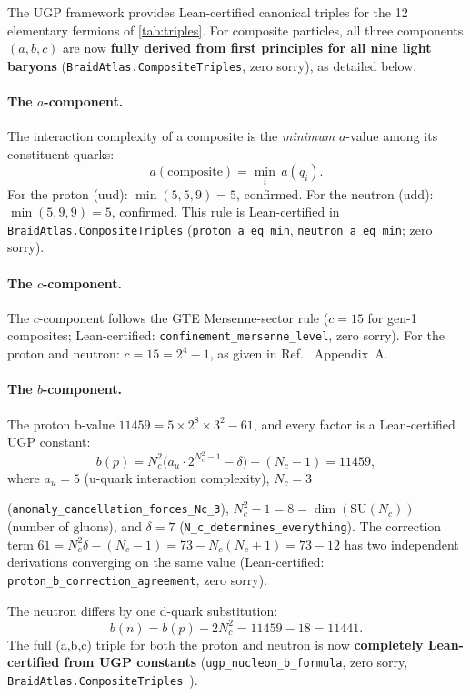 \documentclass[12pt,a4paper]{article}
\begin{document}
The UGP framework provides Lean-certified canonical triples for the 12
elementary fermions of \cref{tab:triples}.
For composite particles, all three components $(a,b,c)$ are now
\textbf{fully derived from first principles for all nine light baryons}
(\texttt{BraidAtlas.CompositeTriples}, zero sorry), as detailed below.

\paragraph{The $a$-component.}
The interaction complexity of a composite is the \emph{minimum} $a$-value
among its constituent quarks:
\[
  a(\text{composite}) = \min_i\, a(q_i).
\]
For the proton (uud): $\min(5,5,9) = 5$, confirmed.
For the neutron (udd): $\min(5,9,9) = 5$, confirmed.
This rule is Lean-certified in \texttt{BraidAtlas.CompositeTriples}
(\texttt{proton\_a\_eq\_min}, \texttt{neutron\_a\_eq\_min}; zero sorry).

\paragraph{The $c$-component.}
The $c$-component follows the GTE Mersenne-sector rule ($c = 15$
for gen-1 composites; Lean-certified: \texttt{confinement\_mersenne\_level}, zero sorry).
For the proton and neutron: $c = 15 = 2^4-1$, as given in
Ref.~\cite{Spivack2026_SM_UGP} Appendix~A.

\paragraph{The $b$-component.}
The proton b-value $11459 = 5\times 2^8\times 3^2 - 61$, and every factor
is a Lean-certified UGP constant:
\begin{equation}
  b(p) = N_c^2\bigl(a_u\cdot 2^{N_c^2-1} - \delta\bigr) + (N_c-1) = 11459,
  \label{eq:proton_b}
\end{equation}
where $a_u = 5$ (u-quark interaction complexity), $N_c = 3$
\begin{sloppypar}
(\texttt{anomaly\_cancellation\_forces\_Nc\_3}), $N_c^2-1 = 8 = \dim(\mathrm{SU}(N_c))$
(number of gluons), and $\delta = 7$
(\texttt{N\_c\_determines\_everything}).
The correction term $61 = N_c^2\delta - (N_c-1) = 73 - N_c(N_c+1) = 73 - 12$
has two independent derivations converging on the same value
(Lean-certified: \texttt{proton\_b\_correction\_agreement}, zero sorry).
\end{sloppypar}
The neutron differs by one d-quark substitution:
\[
  b(n) = b(p) - 2N_c^2 = 11459 - 18 = 11441.
\]
The full (a,b,c) triple for both the proton and neutron is now
\textbf{completely Lean-certified from UGP constants}
(\texttt{ugp\_nucleon\_b\_formula}, zero sorry,
\texttt{BraidAtlas.CompositeTriples}~\cite{ugp-lean}).
\end{document}
